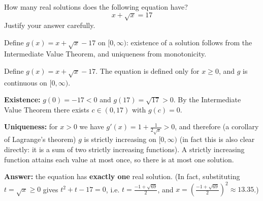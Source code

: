 
\begin{question}
How many real solutions does the following equation have?
\[ x + \sqrt{x} = 17 \]
Justify your answer carefully.
\end{question}

\begin{hint}
Define $g(x) = x + \sqrt{x} - 17$ on $[0,\infty)$: existence of a solution follows from the Intermediate Value Theorem, and uniqueness from monotonicity.
\end{hint}

\begin{solution}
Define $g(x) = x + \sqrt{x} - 17$. The equation is defined only for $x \ge 0$, and $g$ is continuous on $[0,\infty)$.

\textbf{Existence:} $g(0) = -17 < 0$ and $g(17) = \sqrt{17} > 0$. By the Intermediate Value Theorem there exists $c \in (0,17)$ with $g(c) = 0$.

\textbf{Uniqueness:} for $x > 0$ we have $g'(x) = 1 + \frac{1}{2\sqrt{x}} > 0$, and therefore (a corollary of Lagrange's theorem) $g$ is strictly increasing on $[0,\infty)$
(in fact this is also clear directly: it is a sum of two strictly increasing functions). A strictly increasing function attains each value at most once, so there is at most one solution.

\textbf{Answer:} the equation has \textbf{exactly one} real solution. (In fact, substituting $t = \sqrt{x}\ge 0$ gives $t^2 + t - 17 = 0$, i.e. $t = \frac{-1+\sqrt{69}}{2}$, and $x = \left(\frac{-1+\sqrt{69}}{2}\right)^2 \approx 13.35$.)
\end{solution}
